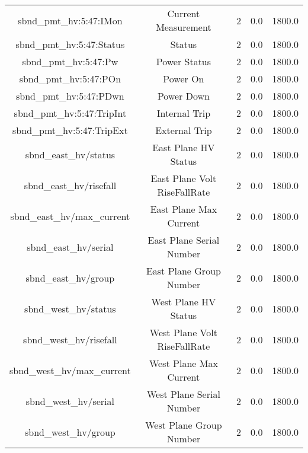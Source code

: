 \begin{center}
\begin{longtable}{c | c c c c }
sbnd\_pmt\_hv:5:47:IMon & Current Measurement & 2 & 0.0 & 1800.0\\ 
sbnd\_pmt\_hv:5:47:Status & Status & 2 & 0.0 & 1800.0\\ 
sbnd\_pmt\_hv:5:47:Pw & Power Status & 2 & 0.0 & 1800.0\\ 
sbnd\_pmt\_hv:5:47:POn & Power On & 2 & 0.0 & 1800.0\\ 
sbnd\_pmt\_hv:5:47:PDwn & Power Down & 2 & 0.0 & 1800.0\\ 
sbnd\_pmt\_hv:5:47:TripInt & Internal Trip & 2 & 0.0 & 1800.0\\ 
sbnd\_pmt\_hv:5:47:TripExt & External Trip & 2 & 0.0 & 1800.0\\ 
sbnd\_east\_hv/status & East Plane HV Status & 2 & 0.0 & 1800.0\\ 
sbnd\_east\_hv/risefall & East Plane Volt RiseFallRate & 2 & 0.0 & 1800.0\\ 
sbnd\_east\_hv/max\_current & East Plane Max Current & 2 & 0.0 & 1800.0\\ 
sbnd\_east\_hv/serial & East Plane Serial Number & 2 & 0.0 & 1800.0\\ 
sbnd\_east\_hv/group & East Plane Group Number & 2 & 0.0 & 1800.0\\ 
sbnd\_west\_hv/status & West Plane HV Status & 2 & 0.0 & 1800.0\\ 
sbnd\_west\_hv/risefall & West Plane Volt RiseFallRate & 2 & 0.0 & 1800.0\\ 
sbnd\_west\_hv/max\_current & West Plane Max Current & 2 & 0.0 & 1800.0\\ 
sbnd\_west\_hv/serial & West Plane Serial Number & 2 & 0.0 & 1800.0\\ 
sbnd\_west\_hv/group & West Plane Group Number & 2 & 0.0 & 1800.0\\ 

\hline
\end{longtable}
\end{center}


